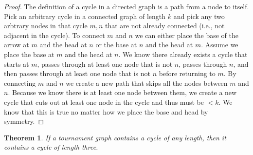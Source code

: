 \documentclass[10pt,letter]{article}
\newtheorem*{thm}{Theorem}
\begin{document}
\begin{proof} The definition of a cycle in a directed graph is a path from a node to itself. Pick an arbitrary cycle in a connected graph of length $k$ and pick any two arbtrary nodes in that cycle $m, n$ that are not already connected (i.e., not adjacent in the cycle). To connect $m$ and $n$ we can either place the base of the arrow at $m$ and the head at $n$ or the base at $n$ and the head at $m$. Assume we place the base at $m$ and the head at $n$. We know there already exists a cycle that starts at $m$, passes through at least one node that is not $n$, passes through $n$, and then passes through at least one node that is not $n$ before returning to $m$. By connecting $m$ and $n$ we create a new path that skips all the nodes between $m$ and $n$. Because we know there is at least one node between them, we create a new cycle that cuts out at least one node in the cycle and thus must be $< k$. We know that this is true no matter how we place the base and head by symmetry.
\end{proof}

\begin{thm} If a tournament graph contains a cycle of any length, then it contains a cycle of length three.
\end{thm}
\end{document}
